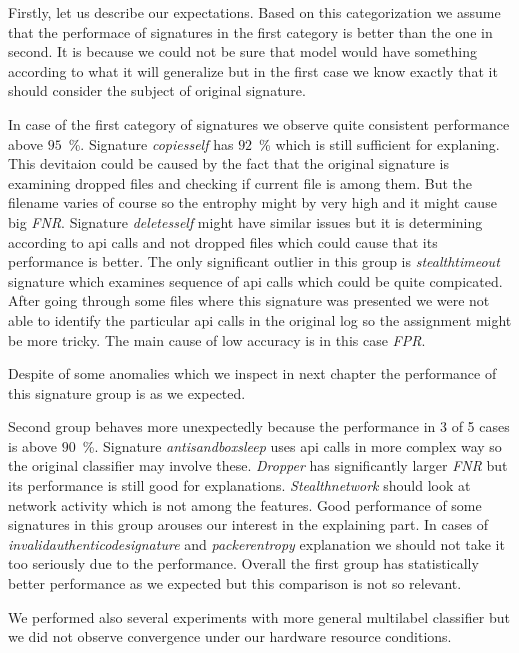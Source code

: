 Firstly, let us describe our expectations. Based on this categorization we assume that the performace of signatures in the first category is better than the one in second. It is because we could not be sure that model would have something according to what it will generalize but in the first case we know exactly that it should consider the subject of original signature.

In case of the first category of signatures we observe quite consistent performance above $95$~\%. Signature \emph{copiesself} has $92$~\% which is still sufficient for explaning. This devitaion could be caused by the fact that the original signature is examining dropped files and checking if current file is among them. But the filename varies of course so the entrophy might by very high and it might cause big \emph{FNR}. Signature \emph{deletesself} might have similar issues but it is determining according to api calls and not dropped files which could cause that its performance is better. The only significant outlier in this group is \emph{stealthtimeout} signature which examines sequence of api calls which could be quite compicated. After going through some files where this signature was presented we were not able to identify the particular api calls in the original log so the assignment might be more tricky. The main cause of low accuracy is in this case \emph{FPR}.

Despite of some anomalies which we inspect in next chapter the performance of this signature group is as we expected. 


Second group behaves more unexpectedly because the performance in 3 of 5 cases  is above $90$~\%. Signature \emph{antisandboxsleep} uses api calls in more complex way so the original classifier may involve these. \emph{Dropper} has significantly larger \emph{FNR} but its performance is still good for explanations. \emph{Stealthnetwork} should look at network activity which is not among the features. Good performance of some signatures in this group arouses our interest in the explaining part. In cases of \emph{invalidauthenticodesignature} and \emph{packerentropy} explanation we should not take it too seriously due to the performance. Overall the first group has statistically better performance as we expected but this comparison is not so relevant.

We performed also several experiments with more general multilabel classifier but we did not observe convergence under our hardware resource conditions.

